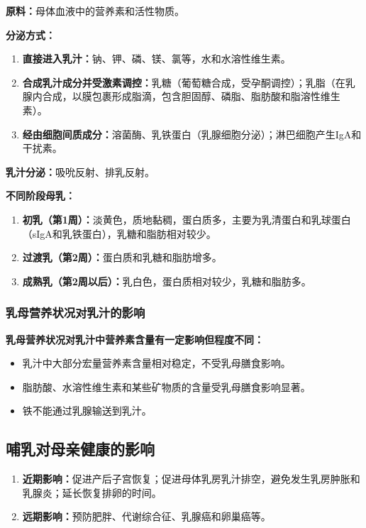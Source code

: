 \begin{keybox}
\textbf{原料：}母体血液中的营养素和活性物质。

\textbf{分泌方式：}
\begin{enumerate}[leftmargin=*]
    \item \textbf{直接进入乳汁：}钠、钾、磷、镁、氯等，水和水溶性维生素。
    \item \textbf{合成乳汁成分并受激素调控：}乳糖（葡萄糖合成，受孕酮调控）；乳脂（在乳腺内合成，以膜包裹形成脂滴，包含胆固醇、磷脂、脂肪酸和脂溶性维生素）。
    \item \textbf{经由细胞间质成分：}溶菌酶、乳铁蛋白（乳腺细胞分泌）；淋巴细胞产生IgA和干扰素。
\end{enumerate}

\textbf{乳汁分泌：}吸吮反射、排乳反射。

\textbf{不同阶段母乳：}
\begin{enumerate}[leftmargin=*]
    \item \textbf{初乳（第1周）：}淡黄色，质地黏稠，蛋白质多，主要为乳清蛋白和乳球蛋白（sIgA和乳铁蛋白），乳糖和脂肪相对较少。
    \item \textbf{过渡乳（第2周）：}蛋白质和乳糖和脂肪增多。
    \item \textbf{成熟乳（第2周以后）：}乳白色，蛋白质相对较少，乳糖和脂肪多。
\end{enumerate}
\end{keybox}

\subsubsection{乳母营养状况对乳汁的影响}

\begin{keybox}
\textbf{乳母营养状况对乳汁中营养素含量有一定影响但程度不同：}
\begin{itemize}[leftmargin=*]
    \item 乳汁中大部分宏量营养素含量相对稳定，不受乳母膳食影响。
    \item 脂肪酸、水溶性维生素和某些矿物质的含量受乳母膳食影响显著。
    \item 铁不能通过乳腺输送到乳汁。
\end{itemize}
\end{keybox}

\subsection{哺乳对母亲健康的影响}

\begin{keybox}
\begin{enumerate}[leftmargin=*]
    \item \textbf{近期影响：}促进产后子宫恢复；促进母体乳房乳汁排空，避免发生乳房肿胀和乳腺炎；延长恢复排卵的时间。
    \item \textbf{远期影响：}预防肥胖、代谢综合征、乳腺癌和卵巢癌等。
\end{enumerate}
\end{keybox}

